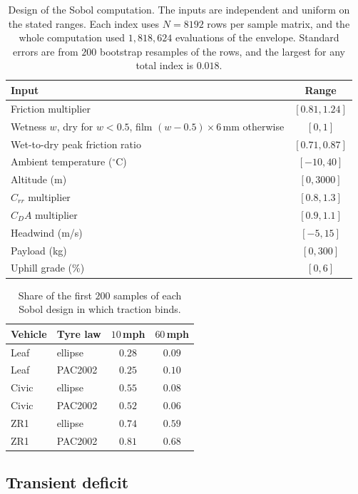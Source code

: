 \documentclass[12pt, twoside]{amsart}
\theoremstyle{definition}
\begin{document}
\begin{table}[htbp]
\centering\small
\caption{Design of the Sobol computation. The inputs are independent and uniform on the stated ranges. Each index uses $N=8192$ rows per sample matrix, and the whole computation used $1{,}818{,}624$ evaluations of the envelope. Standard errors are from $200$ bootstrap resamples of the rows, and the largest for any total index is $0.018$.}\label{tab:app-sobol-design}
\begin{tabular}{lc}
\toprule
Input & Range\\
\midrule
Friction multiplier & $[0.81,1.24]$\\
Wetness $w$, dry for $w<0.5$, film $(w-0.5)\times6$\,mm otherwise & $[0,1]$\\
Wet-to-dry peak friction ratio & $[0.71,0.87]$\\
Ambient temperature ($^\circ$C) & $[-10,40]$\\
Altitude (m) & $[0,3000]$\\
$C_{rr}$ multiplier & $[0.8,1.3]$\\
$C_DA$ multiplier & $[0.9,1.1]$\\
Headwind (m/s) & $[-5,15]$\\
Payload (kg) & $[0,300]$\\
Uphill grade (\%) & $[0,6]$\\
\bottomrule
\end{tabular}
\end{table}

\begin{table}[htbp]
\centering\small
\caption{Share of the first $200$ samples of each Sobol design in which traction binds.}\label{tab:app-sobol-regime}
\begin{tabular}{llcc}
\toprule
Vehicle & Tyre law & $10$\,mph & $60$\,mph\\
\midrule
Leaf & ellipse & $0.28$ & $0.09$\\
Leaf & PAC2002 & $0.25$ & $0.10$\\
Civic & ellipse & $0.55$ & $0.08$\\
Civic & PAC2002 & $0.52$ & $0.06$\\
ZR1 & ellipse & $0.74$ & $0.59$\\
ZR1 & PAC2002 & $0.81$ & $0.68$\\
\bottomrule
\end{tabular}
\end{table}
\FloatBarrier

\subsection{Transient deficit}
\end{document}
